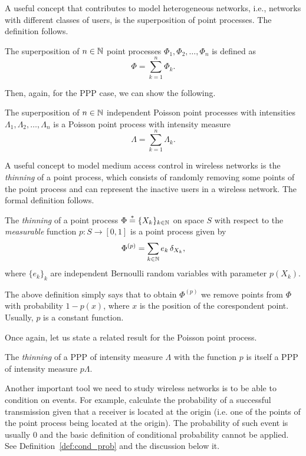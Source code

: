 A useful concept that contributes to model heterogeneous networks, i.e., networks with different classes of users, is the superposition of point processes.
%
The definition follows.
%
\begin{definition}
    The superposition of $n\in{\mathbb N}$ point processes $\Phi_1, \Phi_2, \dots, \Phi_n$ is defined as \[\Phi = \sum_{k=1}^n \Phi_k.\]
\end{definition}

Then, again, for the PPP case, we can show the following.
\begin{theorem}
    The superposition of $n\in{\mathbb N}$ independent Poisson point processes with intensities $\Lambda_1, \Lambda_2, \dots, \Lambda_n$ is a Poisson point process with intensity measure \[\Lambda = \sum_{k=1}^n \Lambda_k.\]
\end{theorem}

A useful concept to model medium access control in wireless networks is the \textit{thinning} of a point process, which consists of randomly removing some points of the point process and can represent the inactive users in a wireless network. The formal definition follows.
%
\begin{definition}
    The \textit{thinning} of a point process $\Phi \stackrel{*}{=} \{X_k\}_{k\in{\mathbb N}}$ on space $S$ with respect to the \textit{measurable} function $p:S\longrightarrow [0,1]$ is a point process given by
    \begin{align*}
        \Phi^{(p)} = \sum_{k\in{\mathbb N}} e_k\,\delta_{X_k},
    \end{align*}
    where $\{e_k\}_k$ are independent Bernoulli random variables with parameter $p(X_k)$. 
\end{definition}
%
The above definition simply says that to obtain $\Phi^{(p)}$ we remove points from $\Phi$ with probability $1-p(x)$, where $x$ is the position of the corespondent point.
%
Usually, $p$ is a constant function.

Once again, let us state a related result for the Poisson point process.
\begin{theorem}
    The \textit{thinning} of a PPP of intensity measure $\Lambda$ with the function $p$ is itself a PPP of intensity measure $p\Lambda$.
\end{theorem}

Another important tool we need to study wireless networks is to be able to condition on events. For example, calculate the probability of a successful transmission given that a receiver is located at the origin (i.e. one of the points of the point process being located at the origin).
%
The probability of such event is usually 0 and the basic definition of conditional probability cannot be applied. See Definition~\ref{def:cond_prob} and the discussion below it.

